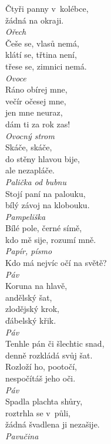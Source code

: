 \begin{multicols}{\value{columnsthindata}}
\noindent
Čtyři panny v~kolébce,\\
žádná na okraji.\\[1 mm]
{\sl Ořech}\\

\noindent
Češe se, vlasů nemá,\\
klátí se, třtina není,\\
třese se, zimnici nemá.\\[1 mm]
{\sl Ovoce}\\

\noindent
Ráno obírej mne,\\
večír očesej mne,\\
jen mne neuraz,\\
dám ti za rok zas!\\[1 mm]
{\sl Ovocný strom}\\

\noindent
Skáče, skáče,\\
do stěny hlavou bije,\\
ale nezapláče.\\[1 mm]
{\sl Palička od bubnu}\\

\noindent
Stojí paní na palouku,\\
bílý závoj na klobouku.\\[1 mm]
{\sl Pampeliška}\\

\noindent
Bílé pole, černé símě,\\
kdo mě sije, rozumí mně.\\[1 mm]
{\sl Papír, písmo}\\

\noindent
Kdo má nejvíc očí na světě?\\[1 mm]
{\sl Páv}\\

\noindent
Koruna na hlavě,\\
andělský šat,\\
zlodějský krok,\\
ďábelský křik.\\[1 mm]
{\sl Páv}\\

\noindent
Tenhle pán či šlechtic snad,\\
denně rozkládá svůj šat.\\
Rozloží ho, pootočí,\\
nespočítáš jeho oči.\\[1 mm]
{\sl Páv}\\

\noindent
Spadla plachta shůry,\\
roztrhla se v~půli,\\
žádná švadlena ji nezašije.\\[1 mm]
{\sl Pavučina}\\


\end{multicols}

